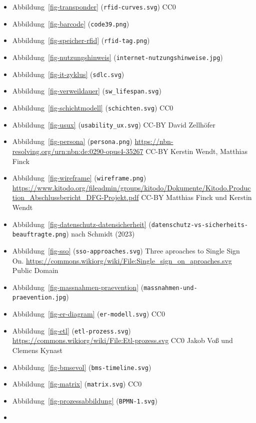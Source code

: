 \documentclass[
  11pt,
  letterpaper,
  DIV=11,
  twoside]{scrreprt}
\providecommand{\tightlist}{%
  \setlength{\itemsep}{0pt}\setlength{\parskip}{0pt}}\usepackage{longtable,booktabs,array}
\begin{document}
\begin{itemize}
\tightlist
\item
  Abbildung~\ref{fig-transponder} (\texttt{rfid-curves.svg}) CC0
\item
  Abbildung~\ref{fig-barcode} (\texttt{code39.png})
\item
  Abbildung~\ref{fig-speicher-rfid} (\texttt{rfid-tag.png})
\item
  Abbildung~\ref{fig-nutzungshinweis}
  (\texttt{internet-nutzungshinweise.jpg})
\item
  Abbildung~\ref{fig-it-zyklus} (\texttt{sdlc.svg})
\item
  Abbildung~\ref{fig-verweildauer} (\texttt{sw\_lifespan.svg})
\item
  Abbildung~\ref{fig-schichtmodell} (\texttt{schichten.svg}) CC0
\item
  Abbildung~\ref{fig-usux} (\texttt{usability\_ux.svg}) CC-BY David
  Zellhöfer
\item
  Abbildung~\ref{fig-persona} (\texttt{persona.png})
  \url{https://nbn-resolving.org/urn:nbn:de:0290-opus4-35267} CC-BY
  Kerstin Wendt, Matthias Finck
\item
  Abbildung~\ref{fig-wireframe} (\texttt{wireframe.png})
  \url{https://www.kitodo.org/fileadmin/groups/kitodo/Dokumente/Kitodo.Production_Abschlussbericht_DFG-Projekt.pdf}
  CC-BY Matthias Finck und Kerstin Wendt
\item
  Abbildung~\ref{fig-datenschutz-datensicherheit}
  (\texttt{datenschutz-vs-sicherheits-beauftragte.png}) nach Schmidt
  (2023)
\item
  Abbildung~\ref{fig-sso} (\texttt{sso-approaches.svg}) Three aproaches
  to Single Sign On.
  \url{https://commons.wikiorg/wiki/File:Single_sign_on_aproaches.svg}
  Public Domain
\item
  Abbildung~\ref{fig-massnahmen-praevention}
  (\texttt{massnahmen-und-praevention.jpg})
\item
  Abbildung~\ref{fig-er-diagram} (\texttt{er-modell.svg}) CC0
\item
  Abbildung~\ref{fig-etl} (\texttt{etl-prozess.svg})
  \url{https://commons.wikiorg/wiki/File:Etl-prozess.svg} CC0 Jakob Voß
  und Clemens Kynast
\item
  Abbildung~\ref{fig-bmsevol} (\texttt{bms-timeline.svg})
\item
  Abbildung~\ref{fig-matrix} (\texttt{matrix.svg}) CC0
\item
  Abbildung~\ref{fig-prozessabbildung} (\texttt{BPMN-1.svg})
\item

\end{itemize}
\end{document}
